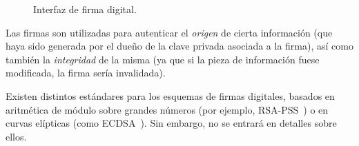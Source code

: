 \begin{figure}
  \centering
  \hspace{1.4em}
  \hspace{1.4em}
  \caption{Interfaz de firma digital.}
  \label{fig:digital-signatures}
\end{figure}


Las firmas son utilizadas para autenticar el \textit{origen} de cierta información (que haya sido generada por el dueño de la clave privada
asociada a la firma), así como también la \textit{integridad} de la misma (ya que si la pieza de información fuese modificada, la firma sería invalidada).

%

Existen distintos estándares para los esquemas de firmas digitales, basados en aritmética de módulo sobre grandes números (por ejemplo,
RSA-PSS~\cite{pss.rsa}) o en curvas elípticas (como ECDSA~\cite{ecdsa}).
Sin embargo, no se entrará en detalles sobre ellos.

